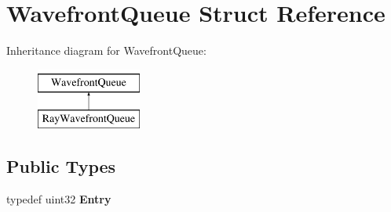 \hypertarget{struct_wavefront_queue}{}\section{Wavefront\+Queue Struct Reference}
\label{struct_wavefront_queue}
Inheritance diagram for Wavefront\+Queue\+:\begin{figure}[H]
\begin{center}
\leavevmode
\includegraphics[height=2.000000cm]{struct_wavefront_queue}
\end{center}
\end{figure}
\subsection*{Public Types}
\begin{DoxyCompactItemize}
\item 
\mbox{\label{struct_wavefront_queue_a6389d1990931241d636424b323219e7b}} 
typedef uint32 {\bfseries Entry}
\end{DoxyCompactItemize}
